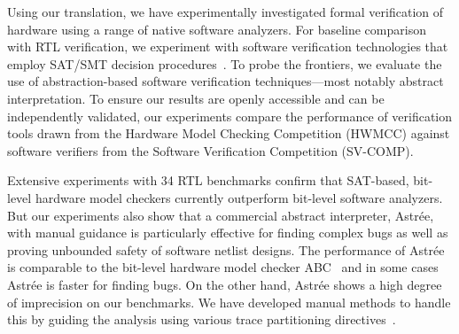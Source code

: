 Using our translation, we have experimentally investigated formal verification of hardware using a range of 
native software analyzers.  For baseline comparison with RTL verification, we experiment with software verification technologies that employ SAT/SMT decision procedures~\cite{DBLP:conf/cav/BeyerK11,2ls,cbmc.tacas:2004,DBLP:conf/tacas/HeizmannDGLMSP16}. To 
probe the frontiers, we evaluate the use of abstraction-based software verification 
techniques---most notably abstract interpretation. To ensure our results are openly accessible and can be independently validated, our experiments compare the performance of verification tools drawn from  the Hardware Model Checking Competition (HWMCC) against software verifiers from the Software Verification Competition (SV-COMP).

Extensive experiments with 34 RTL benchmarks confirm that SAT-based, bit-level hardware model checkers currently outperform bit-level software analyzers.  But our experiments also show that a commercial abstract interpreter, Astr{\'e}e, with manual guidance is particularly effective for finding complex bugs as well as proving unbounded safety of software netlist designs. The performance of Astr{\'e}e is comparable to the bit-level hardware model checker ABC~\cite{abc} and in some cases Astr{\'e}e is faster for finding bugs.  On the other hand,
Astr{\'e}e shows a high degree of imprecision on our benchmarks. We have developed manual methods to handle this by guiding the analysis using various trace partitioning directives~\cite{DBLP:journals/toplas/RivalM07}.

